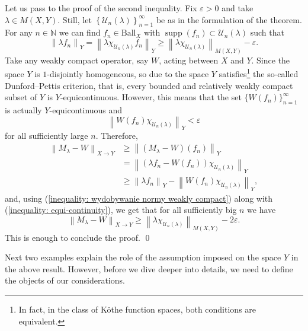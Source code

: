 \documentclass[11pt]{amsart}
\theoremstyle{definition}
\theoremstyle{definition}
\theoremstyle{definition}
\theoremstyle{definition}
\theoremstyle{definition}
\theoremstyle{definition}
\theoremstyle{definition}
\theoremstyle{definition}
\numberwithin{equation}{section}
\numberwithin{equation}{section}
\numberwithin{equation}{section}
\theoremstyle{definition}
\theoremstyle{definition}
\theoremstyle{definition}
\theoremstyle{definition}
\theoremstyle{definition}
\theoremstyle{definition}
\DeclareMathOperator{\supp}{supp}
\newcommand{\norm}[1]{\left\lVert#1\right\rVert}
\renewenvironment{proof}{\noindent {\bf Proof.}}{\qed}
\begin{document}
\begin{proof}
	Let us pass to the proof of the second inequality. Fix $\varepsilon > 0$ and take $\lambda \in M(X,Y)$. Still, let $\left\{ \mathcal{U}_n(\lambda) \right\}_{n=1}^{\infty}$
	be as in the formulation of the theorem. For any $n \in \mathbb{N}$ we can find $f_n \in \text{Ball}_X$ with $\supp(f_n) \subset \mathcal{U}_n(\lambda)$
	such that
	\begin{equation} \label{inequality: wydobywanie normy weakly compact}
		\norm{\lambda f_n}_Y = \norm{\lambda \chi_{\mathcal{U}_n(\lambda)} f_n}_Y \geqslant \norm{\lambda \chi_{\mathcal{U}_n(\lambda)}}_{M(X,Y)} - \varepsilon.
	\end{equation}
	Take any weakly compact operator, say $W$, acting between $X$ and $Y$. Since the space $Y$ is $1$-disjointly homogeneous, so due to
	\cite[Theorem~3.6]{LTM22} the space $Y$ satisfies\footnote{In fact, in the class of K{\" o}the function spaces, both conditions are equivalent.}
	the so-called Dunford--Pettis criterion, that is, every bounded and relatively weakly compact subset of $Y$ is $Y$-equicontinuous. However, this means
	that the set $\{W(f_n)\}_{n=1}^{\infty}$ is actually $Y$-equicontinuous and
	\begin{equation} \label{inequality: equi-continuity}
		\norm{W(f_n)\chi_{\mathcal{U}_n(\lambda)}}_Y < \varepsilon
	\end{equation}
	for all sufficiently large $n$. Therefore,
	\begin{align*}
		\norm{M_{\lambda} - W}_{X \rightarrow Y}
			& \geqslant \norm{(M_{\lambda} - W)(f_n)}_Y \\
			& = \norm{(\lambda f_n - W(f_n))\chi_{\mathcal{U}_n(\lambda)}}_Y \\
			& \geqslant \norm{\lambda f_n}_Y - \norm{W(f_n)\chi_{\mathcal{U}_n(\lambda)}}_Y,
	\end{align*}
	and, using (\ref{inequality: wydobywanie normy weakly compact}) along with (\ref{inequality: equi-continuity}), we get that for all
	sufficiently big $n$ we have
	\begin{equation*}
		\norm{M_{\lambda} - W}_{X \rightarrow Y} \geqslant \norm{\lambda \chi_{\mathcal{U}_n(\lambda)}}_{M(X,Y)} - 2 \varepsilon.
	\end{equation*}
	This is enough to conclude the proof.
\end{proof}

Next two examples explain the role of the assumption imposed on the space $Y$ in the above result.
However, before we dive deeper into details, we need to define the objects of our considerations.
\end{document}
